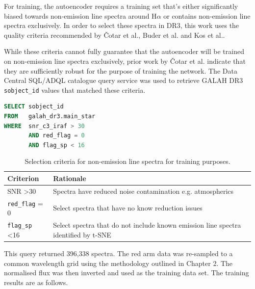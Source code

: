 For training, the autoencoder requires a training set that's either significantly biased towards non-emission line spectra around H$\alpha$ or contains non-emission line spectra exclusively. In order to select these spectra in DR3, this work uses the quality criteria recommended by Čotar et al.\cite{vcotar2021galah}, Buder et al.\cite{buder2021galah+} and Kos et al.\cite{kos2017galah}. 

While these criteria cannot fully guarantee that the autoencoder will be trained on non-emission line spectra exclusively, prior work by Čotar et al. indicate that they are sufficiently robust for the purpose of training the network. The Data Central SQL/ADQL catalogue query service was used to retrieve GALAH DR3 \texttt{sobject\_id} values that matched these criteria.

\begin{lstlisting}[language=SQL]
SELECT sobject_id
FROM   galah_dr3.main_star
WHERE  snr_c3_iraf > 30
       AND red_flag = 0
       AND flag_sp < 16 
\end{lstlisting}

\begin{table}[!htb]
\begin{center}
\begin{tabular}{|l|l|}
\hline
\textbf{Criterion}    & \textbf{Rationale}                                                                 \\ \hline
SNR \textgreater 30   & Spectra have reduced noise contamination e.g. atmospherics      \\ \hline
\texttt{red\_flag} = 0         & Select spectra that have no know reduction issues                                  \\ \hline
\texttt{flag\_sp} \textless 16 & Select spectra that do not include known emission line spectra identified by t-SNE \\ \hline
\end{tabular}
\caption{Selection criteria for non-emission line spectra for training purposes.}
\label{table:Selection Criteria}
\end{center}
\end{table}

This query returned 396,338 spectra. The red arm data was re-sampled to a common wavelength grid using the methodology outlined in Chapter 2. The normalised flux was then inverted and used as the training data set. The training results are as follows.

